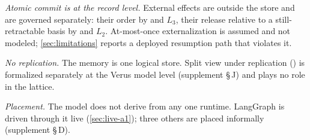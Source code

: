 \smallskip\noindent\emph{Atomic commit is at the record level.} External
effects are outside the store and are governed separately: their order by
 and $L_3$, their release relative to a still-retractable basis by  and
$L_2$. At-most-once externalization is assumed and not modeled; \cref{sec:limitations}
reports a deployed resumption path that violates it.

\smallskip\noindent\emph{No replication.} The memory is one logical store.
Split view under replication () is formalized separately at the Verus
model level (supplement \S\,J) and plays no role in the lattice.

\smallskip\noindent\emph{Placement.} The model does not derive from any one
runtime. LangGraph is driven through it live (\cref{sec:live-a1}); three
others are placed informally (supplement \S\,D).
